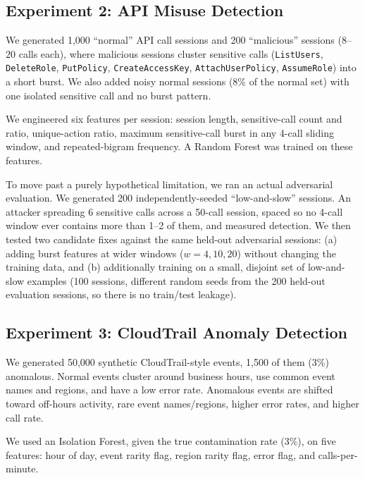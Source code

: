 \documentclass[11pt,a4paper]{article}
\begin{document}
\subsection{Experiment 2: API Misuse Detection}

We generated 1{,}000 ``normal'' API call sessions and 200 ``malicious'' sessions (8--20 calls each), where malicious sessions cluster sensitive calls (\texttt{ListUsers}, \texttt{DeleteRole}, \texttt{PutPolicy}, \texttt{CreateAccessKey}, \texttt{AttachUserPolicy}, \texttt{AssumeRole}) into a short burst. We also added noisy normal sessions (8\% of the normal set) with one isolated sensitive call and no burst pattern.

We engineered six features per session: session length, sensitive-call count and ratio, unique-action ratio, maximum sensitive-call burst in any 4-call sliding window, and repeated-bigram frequency. A Random Forest was trained on these features.

To move past a purely hypothetical limitation, we ran an actual adversarial evaluation. We generated 200 independently-seeded ``low-and-slow'' sessions. An attacker spreading 6 sensitive calls across a 50-call session, spaced so no 4-call window ever contains more than 1--2 of them, and measured detection. We then tested two candidate fixes against the same held-out adversarial sessions: (a) adding burst features at wider windows ($w=4,10,20$) without changing the training data, and (b) additionally training on a small, disjoint set of low-and-slow examples (100 sessions, different random seeds from the 200 held-out evaluation sessions, so there is no train/test leakage).

\subsection{Experiment 3: CloudTrail Anomaly Detection}

We generated 50{,}000 synthetic CloudTrail-style events, 1{,}500 of them (3\%) anomalous. Normal events cluster around business hours, use common event names and regions, and have a low error rate. Anomalous events are shifted toward off-hours activity, rare event names/regions, higher error rates, and higher call rate.

We used an Isolation Forest, given the true contamination rate (3\%), on five features: hour of day, event rarity flag, region rarity flag, error flag, and calls-per-minute.
\end{document}
